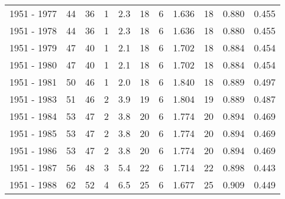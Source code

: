 \begin{tabular}{lrrrrrrrrrr}
1951 - 1977 &       44 &       36 &                 1 &               2.3 &                      18 &                          6 &       1.636 &             18 &       0.880 &             0.455 \\
1951 - 1978 &       44 &       36 &                 1 &               2.3 &                      18 &                          6 &       1.636 &             18 &       0.880 &             0.455 \\
1951 - 1979 &       47 &       40 &                 1 &               2.1 &                      18 &                          6 &       1.702 &             18 &       0.884 &             0.454 \\
1951 - 1980 &       47 &       40 &                 1 &               2.1 &                      18 &                          6 &       1.702 &             18 &       0.884 &             0.454 \\
1951 - 1981 &       50 &       46 &                 1 &               2.0 &                      18 &                          6 &       1.840 &             18 &       0.889 &             0.497 \\
1951 - 1983 &       51 &       46 &                 2 &               3.9 &                      19 &                          6 &       1.804 &             19 &       0.889 &             0.487 \\
1951 - 1984 &       53 &       47 &                 2 &               3.8 &                      20 &                          6 &       1.774 &             20 &       0.894 &             0.469 \\
1951 - 1985 &       53 &       47 &                 2 &               3.8 &                      20 &                          6 &       1.774 &             20 &       0.894 &             0.469 \\
1951 - 1986 &       53 &       47 &                 2 &               3.8 &                      20 &                          6 &       1.774 &             20 &       0.894 &             0.469 \\
1951 - 1987 &       56 &       48 &                 3 &               5.4 &                      22 &                          6 &       1.714 &             22 &       0.898 &             0.443 \\
1951 - 1988 &       62 &       52 &                 4 &               6.5 &                      25 &                          6 &       1.677 &             25 &       0.909 &             0.449 \\

\end{tabular}
